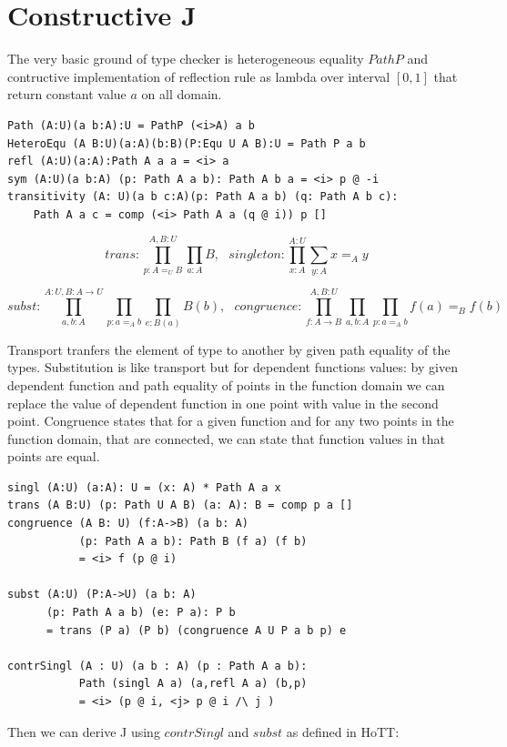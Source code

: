 \documentclass{svproc}
\begin{document}
\newpage
\section{Constructive J}

The very basic ground of type checker is heterogeneous equality $PathP$ and contructive
implementation of reflection rule as lambda over interval $[0,1]$ that
return constant value $a$ on all domain.

\begin{lstlisting}[mathescape=true]
Path (A:U)(a b:A):U = PathP (<i>A) a b
HeteroEqu (A B:U)(a:A)(b:B)(P:Equ U A B):U = Path P a b
refl (A:U)(a:A):Path A a a = <i> a
sym (A:U)(a b:A) (p: Path A a b): Path A b a = <i> p @ -i
transitivity (A: U)(a b c:A)(p: Path A a b) (q: Path A b c):
    Path A a c = comp (<i> Path A a (q @ i)) p []
\end{lstlisting}

$$trans : \prod_{p:A=_U B}^{A,B:U} \prod_{a:A} B,\ \ \ singleton : \prod_{x:A}^{A:U} \sum_{y:A} x =_A y $$

$$subst : \prod_{a,b:A}^{A:U,B:A\rightarrow U} \prod_{p: a =_A b} \prod_{e:B(a)} B(b), \ \ \ 
  congruence : \prod_{f:A\rightarrow B}^{A,B:U} \prod_{a,b:A} \prod_{p:a =_A b} f(a) =_B f(b) $$

Transport tranfers the element of type to another by given path equality of the types.
Substitution is like transport but for dependent functions values: by given dependent function
and path equality of points in the function domain we can replace the value of dependent function
in one point with value in the second point. Congruence states that for a given function
and for any two points in the function domain, that are connected, we can state that function
values in that points are equal.

\begin{lstlisting}[mathescape=true]
singl (A:U) (a:A): U = (x: A) * Path A a x
trans (A B:U) (p: Path U A B) (a: A): B = comp p a []
congruence (A B: U) (f:A->B) (a b: A)
           (p: Path A a b): Path B (f a) (f b)
           = <i> f (p @ i)

subst (A:U) (P:A->U) (a b: A)
      (p: Path A a b) (e: P a): P b
      = trans (P a) (P b) (congruence A U P a b p) e

contrSingl (A : U) (a b : A) (p : Path A a b):
           Path (singl A a) (a,refl A a) (b,p)
           = <i> (p @ i, <j> p @ i /\ j )
\end{lstlisting}

Then we can derive J using $contrSingl$ and $subst$ as defined in HoTT\cite{HoTT}:
\end{document}
